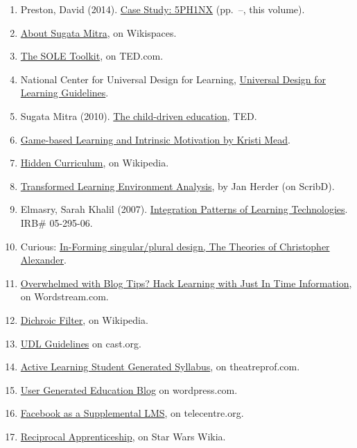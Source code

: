 \begin{enumerate}
\def\labelenumi{\arabic{enumi}.}
\item
  Preston, David (2014).
  \href{http://peeragogy.org/case-study-5ph1nx/}{Case Study: 5PH1NX}
  (pp.~--, this volume).
\item
  \href{http://sugatam.wikispaces.com/}{About Sugata Mitra}, on
  Wikispaces.
\item
  \href{http://www.ted.com/pages/sole_toolkit}{The SOLE Toolkit}, on
  TED.com.
\item
  National Center for Universal Design for Learning,
  \href{http://www.udlcenter.org/aboutudl/udlguidelines}{Universal
  Design for Learning Guidelines}.
\item
  Sugata Mitra (2010).
  \href{http://www.ted.com/talks/sugata_mitra_the_child_driven_education.html}{The
  child-driven education}, TED.
\item
  \href{http://www.academia.edu/1137269/Game-based_Learning_and_Intrinsic_Motivation}{Game-based
  Learning and Intrinsic Motivation by Kristi Mead}.
\item
  \href{http://en.wikipedia.org/wiki/Hidden_curriculum}{Hidden
  Curriculum}, on Wikipedia.
\item
  \href{http://www.scribd.com/doc/181089012/Transformed-Learning-Environment-Analysis}{Transformed
  Learning Environment Analysis}, by Jan Herder (on ScribD).
\item
  Elmasry, Sarah Khalil (2007).
  \href{http://scholar.lib.vt.edu/theses/available/etd-09232007-220306/unrestricted/SElmasryETDbodytext.pdf}{Integration
  Patterns of Learning Technologies}. IRB\# 05-295-06.
\item
  Curious:
  \href{http://nourdiab.wordpress.com/2011/02/23/the-theories-of-christopher-alexander/}{In-Forming
  singular/plural design, The Theories of Christopher Alexander}.
\item
  \href{http://www.wordstream.com/blog/ws/2013/10/02/just-in-time-information-hacks}{Overwhelmed
  with Blog Tips? Hack Learning with Just In Time Information}, on
  Wordstream.com.
\item
  \href{http://en.wikipedia.org/wiki/Dichroic_filter}{Dichroic Filter},
  on Wikipedia.
\item
  \href{http://www.cast.org/library/UDLguidelines/}{UDL Guidelines} on
  cast.org.
\item
  \href{http://www.theatreprof.com/2011/active-learning-student-generated-syllabus/}{Active
  Learning Student Generated Syllabus}, on theatreprof.com.
\item
  \href{http://usergeneratededucation.wordpress.com/}{User Generated
  Education Blog} on wordpress.com.
\item
  \href{http://community.telecentre.org/profiles/blogs/facebook-as-a-supplemental-lms}{Facebook
  as a Supplemental LMS}, on telecentre.org.
\item
  \href{http://starwars.wikia.com/wiki/Reciprocal_apprenticeship}{Reciprocal
  Apprenticeship}, on Star Wars Wikia.
\end{enumerate}
